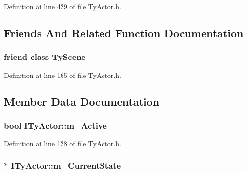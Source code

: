Definition at line 429 of file TyActor.h.



\subsection{Friends And Related Function Documentation}
\hypertarget{class_i_ty_actor_ab2b75df334224ada5c17385cb5eeedc6}{
\subsubsection[{TyScene}]{\setlength{\rightskip}{0pt plus 5cm}friend class {\bf TyScene}}}
\label{class_i_ty_actor_ab2b75df334224ada5c17385cb5eeedc6}


Definition at line 165 of file TyActor.h.



\subsection{Member Data Documentation}
\hypertarget{class_i_ty_actor_ae460cd48bef240e11cfa5df7a505cbe9}{
\subsubsection[{m\_\-Active}]{\setlength{\rightskip}{0pt plus 5cm}bool {\bf ITyActor::m\_\-Active}}}
\label{class_i_ty_actor_ae460cd48bef240e11cfa5df7a505cbe9}


Definition at line 128 of file TyActor.h.

\hypertarget{class_i_ty_actor_a6da0cfc7b9084c69114f601742413a2f}{
\subsubsection[{m\_\-CurrentState}]{$\ast$ {\bf ITyActor::m\_\-CurrentState}}}
\label{class_i_ty_actor_a6da0cfc7b9084c69114f601742413a2f}


